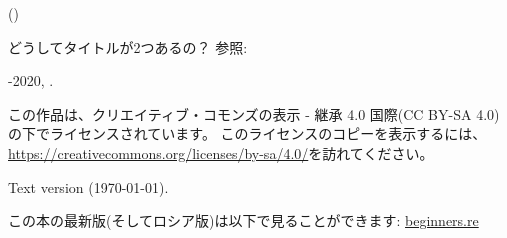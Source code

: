 ﻿\begin{titlepage}


\end{titlepage}

\newpage

\begin{center}
\vspace*{\fill}
{\LARGE \TitleMain}

\bigskip

{\large (\TitleAux)}

\bigskip
\bigskip
どうしてタイトルが2つあるの？ 参照: 

\vspace*{\fill}

{\large \AUTHOR}

{\large \TT{<\EMAIL>}}
\vspace*{\fill}
\vfill

\ccbysa

-2020, \AUTHOR. 

この作品は、クリエイティブ・コモンズの表示 - 継承 4.0 国際(CC BY-SA 4.0)の下でライセンスされています。
このライセンスのコピーを表示するには、\url{https://creativecommons.org/licenses/by-sa/4.0/}を訪れてください。

Text version ({\large \today}).

この本の最新版(そしてロシア版)は以下で見ることができます: \href{http://go.yurichev.com/17009}{beginners.re}

\end{center}
